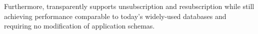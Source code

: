 Furthermore, \sys transparently supports unsubscription and resubscription while still achieving performance
comparable to today’s widely-used databases and requiring no modification of application schemas.

%
%
%
%
%
